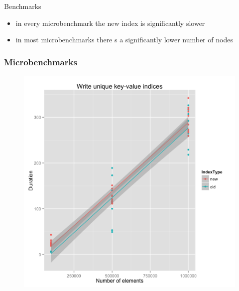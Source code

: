 \documentclass{beamer}
\begin{document}
\begin{section}{Benchmarks}
\begin{frame}
\begin{figure}
      \end{figure}
      \pause
        \begin{itemize}
          \item in every microbenchmark the new index is significantly slower
          \item in most microbenchmarks there s a significantly lower number of nodes
        \end{itemize}
    \end{frame}

    \begin{frame}
      \frametitle{Microbenchmarks}
      \begin{figure}
        \includegraphics[scale=0.3]{images/nonUnique_random_write.png}
      \end{figure}
    \end{frame}


\end{section}
\end{document}
